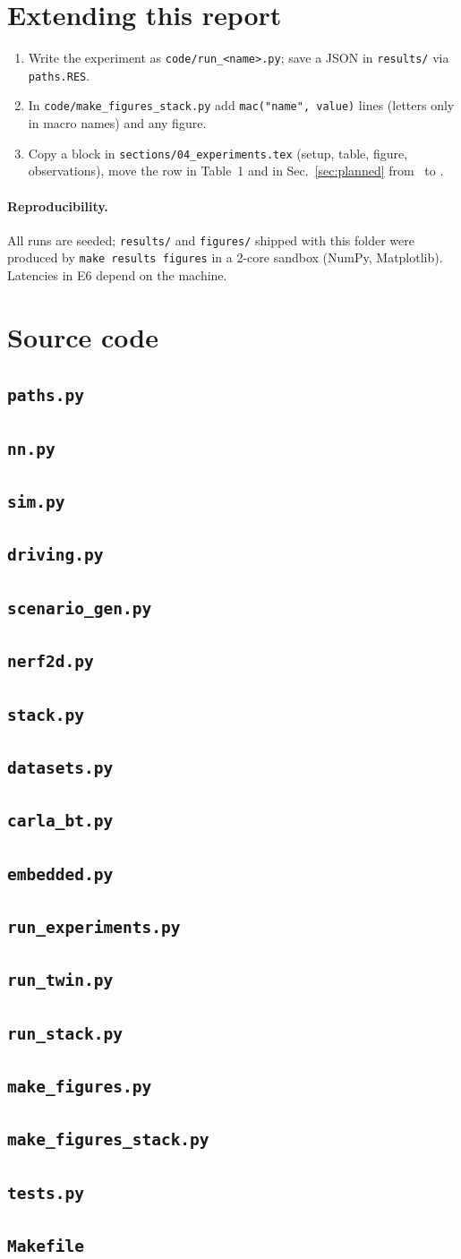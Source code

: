 \section{Extending this report}\label{app:extend}
\begin{enumerate}[leftmargin=*,itemsep=1pt]
\item Write the experiment as \texttt{code/run\_<name>.py}; save a JSON in \texttt{results/} via \texttt{paths.RES}.
\item In \texttt{code/make\_figures\_stack.py} add \texttt{mac("name", value)} lines (letters only in macro names) and any figure.
\item Copy a block in \texttt{sections/04\_experiments.tex} (setup, table, figure, observations), move the row in Table~1 and in Sec.~\ref{sec:planned} from \planned\ to \done.
\end{enumerate}
\paragraph{Reproducibility.} All runs are seeded; \texttt{results/} and \texttt{figures/} shipped with this folder were produced by \texttt{make results figures} in a 2-core sandbox (NumPy, Matplotlib). Latencies in E6 depend on the machine.

\section{Source code}\label{app:code}
\newcommand{\code}[3]{\subsection{\texttt{#2}}\label{#3}}
\code{paths.py}{paths.py}{c:paths}
\code{nn.py}{nn.py}{c:nn}
\code{sim.py}{sim.py}{c:sim}
\code{driving.py}{driving.py}{c:driving}
\code{scenario_gen.py}{scenario\_gen.py}{c:gen}
\code{nerf2d.py}{nerf2d.py}{c:nerf}
\code{stack.py}{stack.py}{c:stack}
\code{datasets.py}{datasets.py}{c:data}
\code{carla_bt.py}{carla\_bt.py}{c:carla}
\code{embedded.py}{embedded.py}{c:emb}
\code{run_experiments.py}{run\_experiments.py}{c:rune}
\code{run_twin.py}{run\_twin.py}{c:runt}
\code{run_stack.py}{run\_stack.py}{c:runs}
\code{make_figures.py}{make\_figures.py}{c:mf}
\code{make_figures_stack.py}{make\_figures\_stack.py}{c:mfs}
\code{tests.py}{tests.py}{c:tests}
\subsection{\texttt{Makefile}}
